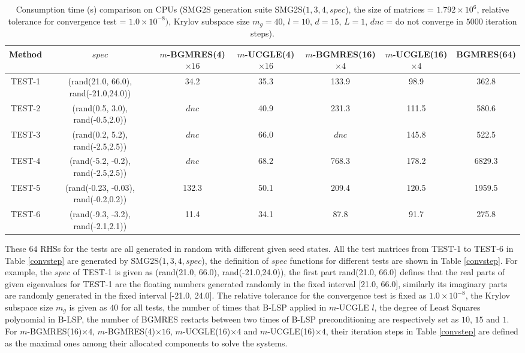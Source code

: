 \begin{table}
	\label{time}
	\caption{Consumption time (s) comparison on CPUs (SMG2S generation suite SMG2S($1,3,4, spec$), the size of matrices = $1.792 \times 10^6$, relative tolerance for convergence test = $1.0\times10^{-8})$, Krylov subspace size $m_g = 40$, $l = 10$, $d=15$, $L = 1$, $dnc$ = do not converge in $5000$ iteration steps).}
	\centering
	\renewcommand{\arraystretch}{1.6}
	\begin{tabular}{c*{6}{c}}
		\toprule
		Method            & $spec$ & $m$-BGMRES(4)$\times 16$  & $m$-UCGLE(4)$\times 16$   &  $m$-BGMRES(16)$\times 4$ &  $m$-UCGLE(16)$\times 4$ &  BGMRES(64) \\
		\hline
		TEST-1 &(rand(21.0, 66.0), rand(-21.0,24.0))& \cellcolor{red!20}34.2&	35.3	&133.9	&98.9	&\cellcolor{blue!20}362.8\\
		TEST-2   &   (rand(0.5, 3.0), rand(-0.5,2.0))      & $dnc$  & \cellcolor{red!20}40.9	&231.3	&111.5	&\cellcolor{blue!20}580.6\\
		TEST-3    &     (rand(0.2, 5.2), rand(-2.5,2.5))    & $dnc$  & \cellcolor{red!20}66.0 & $dnc$  & 145.8 & \cellcolor{blue!20}522.5 \\
		TEST-4    & (rand(-5.2, -0.2), rand(-2.5,2.5))  & $dnc$  & \cellcolor{red!20}68.2 & 768.3 & 178.2 & \cellcolor{blue!20}6829.3\\
		TEST-5    &  (rand(-0.23, -0.03), rand(-0.2,0.2))  & 132.3 & \cellcolor{red!20}50.1 & 209.4 & 120.5 & \cellcolor{blue!20}1959.5 \\
		TEST-6    &  (rand(-9.3, -3.2), rand(-2.1,2.1))  & \cellcolor{red!20}11.4 & 34.1 & 87.8 & 91.7 & \cellcolor{blue!20}275.8\\
		\hline
	\end{tabular}
	\label{times}
	
\end{table} %


These $64$ RHSs for the tests are all generated in random with different given seed states. All the test matrices from TEST-1 to TEST-6 in Table \ref{convstep} are generated by SMG2S($1,3,4,spec$), the definition of $spec$ functions for different tests are shown in Table  \ref{convstep}. For example, the $spec$ of TEST-1 is given as (rand(21.0, 66.0), rand(-21.0,24.0)), the first part rand(21.0, 66.0) defines that the real parts of given eigenvalues for TEST-1 are the floating numbers generated randomly in the fixed interval [21.0, 66.0], similarly its imaginary parts are randomly generated in the fixed interval [-21.0, 24.0]. The relative tolerance for the convergence test is fixed as $1.0 \times 10^{-8}$, the Krylov subspace size $m_g$ is given as $40$ for all tests, the number of times that B-LSP applied in $m$-UCGLE $l$, the degree of Least Squares polynomial in B-LSP, the number of BGMRES restarts between two times of B-LSP preconditioning are respectively set as $10$, $15$ and $1$.  For $m$-BGMRES(16)$\times 4$, $m$-BGMRES(4)$\times 16$,  $m$-UCGLE(16)$\times 4$ and $m$-UCGLE(16)$\times 4$, their iteration steps in Table \ref{convstep} are defined as the maximal ones among their allocated components to solve the systems. 

